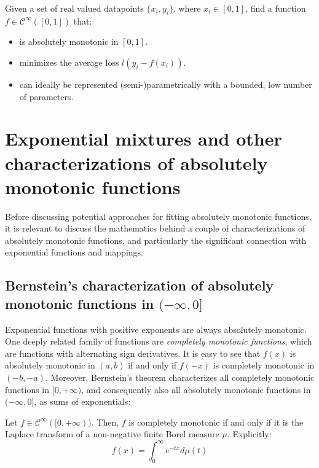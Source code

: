 \documentclass[12pt,a4paper]{article}
\newcommand{\cinfty} {\mathcal{C}^{\infty}}
\begin{document}
\begin{problem}
Given a set of real valued datapoints $\{x_i,y_i\}$, where $x_i \in [0,1]$, find a function $f \in \cinfty([0,1])$ that:
\begin{itemize}
\item is absolutely monotonic in $[0,1]$.
\item minimizes the average loss $l(y_i - f(x_i))$.
\item can ideally be represented (semi-)parametrically with a bounded, low number of parameters.
\end{itemize}
\end{problem}

\section{Exponential mixtures and other characterizations of absolutely monotonic functions}
\label{characterizations}

Before discussing potential approaches for fitting absolutely monotonic functions, it is relevant to discuss the mathematics behind a couple of characterizations of absolutely monotonic functions, and particularly the significant connection with exponential functions and mappings.

\subsection{Bernstein's characterization of absolutely monotonic functions in $(-\infty,0]$}

Exponential functions with positive exponents are always absolutely monotonic. One deeply related family of functions are {\emph{completely monotonic functions}}, which are functions with alternating sign derivatives. It is easy to see that $f(x)$ is absolutely monotonic in $(a,b)$ if and only if $f(-x)$ is completely monotonic in $(-b,-a)$. Moreover, Bernstein's theorem characterizes all completely monotonic functions in $[0,+\infty)$, and consequently also all absolutely monotonic functions in $(-\infty,0]$, as sums of exponentials:

\begin{theorem}
Let $f \in \cinfty([0,+\infty))$.
Then, $f$ is completely monotonic if and only if it is the Laplace transform of a non-negative finite Borel measure $\mu$. Explicitly:
\begin{equation}
f(x) = \int_0^{\infty} e^{-tx}d\mu(t)
\end{equation}
\end{theorem}
\end{document}

